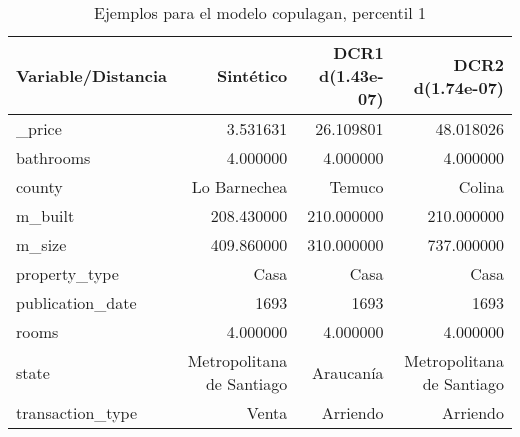 \begin{table}[H]
\centering
\fontsize{10}{14}\selectfont
\caption{Ejemplos para el modelo copulagan, percentil 1}
\label{table-example-economicos-a-2-copulagan-1p}
\begin{tabular}{|l|r|r|r|}
\hline
\rowcolor[gray]{0.8}
Variable/Distancia & Sintético & DCR1 d(1.43e-07) & DCR2 d(1.74e-07) \\
\hline \_price & \cellcolor[rgb]{0.9, 0.54, 0.52} 3.531631 & 26.109801 & 48.018026 \\
\hline bathrooms & \cellcolor[rgb]{0.9, 0.54, 0.52} 4.000000 & \cellcolor[rgb]{0.9, 0.54, 0.52} 4.000000 & \cellcolor[rgb]{0.9, 0.54, 0.52} 4.000000 \\
\hline county & \cellcolor[rgb]{0.9, 0.54, 0.52} Lo Barnechea & Temuco & Colina \\
\hline m\_built & \cellcolor[rgb]{0.9, 0.54, 0.52} 208.430000 & 210.000000 & 210.000000 \\
\hline m\_size & \cellcolor[rgb]{0.9, 0.54, 0.52} 409.860000 & 310.000000 & 737.000000 \\
\hline property\_type & \cellcolor[rgb]{0.9, 0.54, 0.52} Casa & \cellcolor[rgb]{0.9, 0.54, 0.52} Casa & \cellcolor[rgb]{0.9, 0.54, 0.52} Casa \\
\hline publication\_date & \cellcolor[rgb]{0.9, 0.54, 0.52} 1693 & \cellcolor[rgb]{0.9, 0.54, 0.52} 1693 & \cellcolor[rgb]{0.9, 0.54, 0.52} 1693 \\
\hline rooms & \cellcolor[rgb]{0.9, 0.54, 0.52} 4.000000 & \cellcolor[rgb]{0.9, 0.54, 0.52} 4.000000 & \cellcolor[rgb]{0.9, 0.54, 0.52} 4.000000 \\
\hline state & \cellcolor[rgb]{0.9, 0.54, 0.52} Metropolitana de Santiago & Araucanía & \cellcolor[rgb]{0.9, 0.54, 0.52} Metropolitana de Santiago \\
\hline transaction\_type & \cellcolor[rgb]{0.9, 0.54, 0.52} Venta & Arriendo & Arriendo \\
\hline
\end{tabular}
\end{table}
